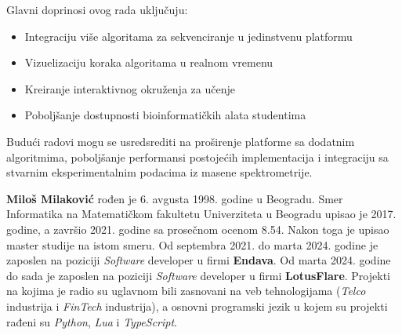 \documentclass[12pt,oneside]{memoir}
\begin{document}
Glavni doprinosi ovog rada uključuju:
\begin{itemize}
    \item Integraciju više algoritama za sekvenciranje u jedinstvenu platformu
    \item Vizuelizaciju koraka algoritama u realnom vremenu
    \item Kreiranje interaktivnog okruženja za učenje
    \item Poboljšanje dostupnosti bioinformatičkih alata studentima
\end{itemize}

Budući radovi mogu se usredsrediti na proširenje platforme sa dodatnim algoritmima, poboljšanje performansi postojećih implementacija i integraciju sa stvarnim eksperimentalnim podacima iz masene spektrometrije.

\literatura

\backmatter

\begin{biografija}
  \textbf{Miloš Milaković} rođen je 6. avgusta 1998. godine u Beogradu. Smer Informatika na Matematičkom fakultetu Univerziteta u Beogradu upisao je 2017. godine, a završio 2021. godine sa prosečnom ocenom 8.54. Nakon toga je upisao master studije na istom smeru. 
  Od septembra 2021. do marta 2024. godine je zaposlen na poziciji \emph{Software} developer u firmi \textbf{Endava}. Od marta 2024. godine do sada je zaposlen na poziciji \emph{Software} developer u firmi \textbf{LotusFlare}. Projekti na kojima je radio su uglavnom bili zasnovani na veb tehnologijama (\emph{Telco} industrija i \emph{FinTech} industrija), a osnovni programski jezik u kojem su projekti rađeni su \emph{Python}, \emph{Lua} i \emph{TypeScript}.
\end{biografija}
\end{document}
